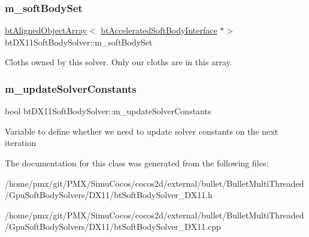 \subsubsection{\texorpdfstring{m\+\_\+soft\+Body\+Set}{m\_softBodySet}}
{\footnotesize\ttfamily \hyperlink{classbtAlignedObjectArray}{bt\+Aligned\+Object\+Array}$<$ \hyperlink{classbtDX11SoftBodySolver_1_1btAcceleratedSoftBodyInterface}{bt\+Accelerated\+Soft\+Body\+Interface} $\ast$$>$ bt\+D\+X11\+Soft\+Body\+Solver\+::m\+\_\+soft\+Body\+Set\hspace{0.3cm}{\ttfamily [protected]}}

Cloths owned by this solver. Only our cloths are in this array. \mbox{\label{classbtDX11SoftBodySolver_a15ab079a7dde751958b96341c4bcb08b}} 
\subsubsection{\texorpdfstring{m\+\_\+update\+Solver\+Constants}{m\_updateSolverConstants}}
{\footnotesize\ttfamily bool bt\+D\+X11\+Soft\+Body\+Solver\+::m\+\_\+update\+Solver\+Constants\hspace{0.3cm}{\ttfamily [protected]}}

Variable to define whether we need to update solver constants on the next iteration 

The documentation for this class was generated from the following files\+:\begin{DoxyCompactItemize}
\item 
/home/pmx/git/\+P\+M\+X/\+Simu\+Cocos/cocos2d/external/bullet/\+Bullet\+Multi\+Threaded/\+Gpu\+Soft\+Body\+Solvers/\+D\+X11/bt\+Soft\+Body\+Solver\+\_\+\+D\+X11.\+h\item 
/home/pmx/git/\+P\+M\+X/\+Simu\+Cocos/cocos2d/external/bullet/\+Bullet\+Multi\+Threaded/\+Gpu\+Soft\+Body\+Solvers/\+D\+X11/bt\+Soft\+Body\+Solver\+\_\+\+D\+X11.\+cpp\end{DoxyCompactItemize}
